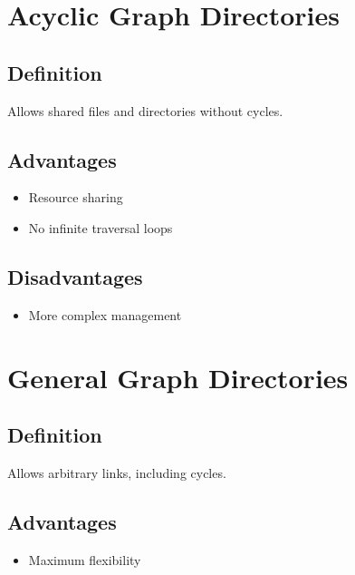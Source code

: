 \section{Acyclic Graph Directories}

\subsection{Definition}

Allows shared files and directories without cycles.

\subsection{Advantages}

\begin{itemize}
\item Resource sharing
\item No infinite traversal loops
\end{itemize}

\subsection{Disadvantages}

\begin{itemize}
\item More complex management
\end{itemize}

\section{General Graph Directories}

\subsection{Definition}

Allows arbitrary links, including cycles.

\subsection{Advantages}

\begin{itemize}
\item Maximum flexibility
\end{itemize}

